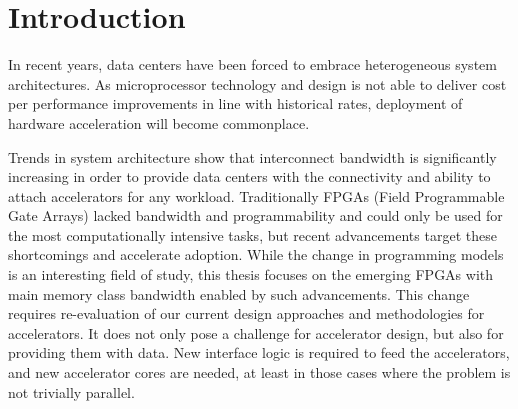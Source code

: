\chapter{Introduction}
\label{sec:intro}

In recent years, data centers have been forced to embrace heterogeneous system architectures. As microprocessor technology and design is not able to deliver cost per performance improvements in line with historical rates, deployment of hardware acceleration will become commonplace.

Trends in system architecture show that interconnect bandwidth is significantly increasing in order to provide data centers with the connectivity and ability to attach accelerators for any workload. Traditionally FPGAs (Field Programmable Gate Arrays) lacked bandwidth and programmability and could only be used for the most computationally intensive tasks, but recent advancements target these shortcomings and accelerate adoption. While the change in programming models is an interesting field of study, this thesis focuses on the emerging FPGAs with main memory class bandwidth enabled by such advancements. This change requires re-evaluation of our current design approaches and methodologies for accelerators. It does not only pose a challenge for accelerator design, but also for providing them with data. New interface logic is required to feed the accelerators, and new accelerator cores are needed, at least in those cases where the problem is not trivially parallel.


